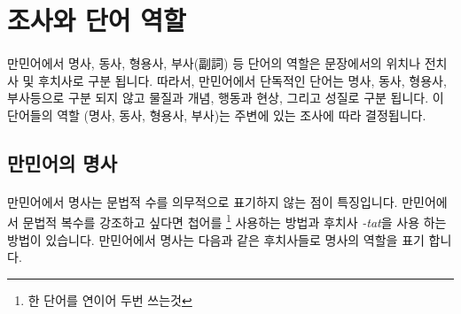\documentclass{book}
\begin{document}
    \section{조사와 단어 역할}
            \paragraph{}
    만민어에서 명사, 동사, 형용사, 부사(副詞) 등 단어의 역할은 문장에서의 위치나 전치사 및 후치사로 구분 됩니다. 따라서, 만민어에서 단독적인 단어는 명사, 동사, 형용사, 부사등으로 구분 되지 않고 물질과 개념, 행동과 현상, 그리고 성질로 구분 됩니다. 이 단어들의 역할 (명사, 동사, 형용사, 부사)는 주변에 있는 조사에 따라 결정됩니다. 
        \subsection{만민어의 명사}
            \paragraph{}
    만민어에서 명사는 문법적 수를 의무적으로 표기하지 않는 점이 특징입니다. 만민어에서 문법적 복수를 강조하고 싶다면 첩어를 \footnote{한 단어를 연이어 두번 쓰는것} 사용하는 방법과 후치사 \textit{-tat}을 사용 하는 방법이 있습니다. 만민어에서 명사는 다음과 같은 후치사들로 명사의 역할을 표기 합니다.
                                                                                                                                  
    
\end{document}
